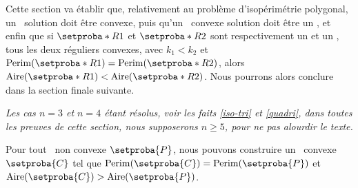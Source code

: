 Cette section va établir que, relativement au problème d'isopérimétrie polygonal,
un \ngone\ solution doit être convexe, 
puis
qu'un \ngone\ convexe solution doit être un \nreg,
et enfin
que si $\setproba*{R}{1}$ et $\setproba*{R}{2}$ sont respectivement un  et un , tous les deux réguliers convexes, avec 
$k_1 < k_2$ et $\perim{\setproba*{R}{1}} = \perim{\setproba*{R}{2}}$, 
alors
$\area{\setproba*{R}{1}} < \area{\setproba*{R}{2}}$.
Nous pourrons alors conclure dans la section finale suivante.


\begin{tcolorbox}
	\itshape\small
	Les cas $n = 3$ et $n = 4$ étant résolus, voir les faits \ref{iso-tri} et \ref{quadri}, dans toutes les preuves de cette section, nous supposerons $n \geq 5$, pour ne pas alourdir le texte.
\end{tcolorbox}




\begin{fact} \label{must-be-conv}
    Pour tout \ngone\ non convexe $\setproba{P}$,
	nous pouvons construire un \ngone\ convexe $\setproba{C}$ tel que
	$\perim{\setproba{C}} = \perim{\setproba{P}}$
	et
	$\area{\setproba{C}} > \area{\setproba{P}}$.
\end{fact}


